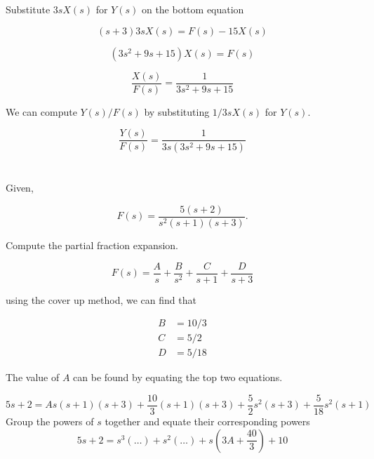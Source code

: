 \documentclass[12pt]{article}
\numberwithin{equation}{section}
\begin{document}
  Substitute $ 3sX(s) $ for $ Y(s) $ on the bottom equation

  \begin{equation}
    (s + 3)3sX(s) = F(s) - 15X(s)
  \end{equation}

  \begin{equation}
    (3s^2 + 9s + 15)X(s) = F(s)
  \end{equation}

  \begin{equation}
    \frac{X(s)}{F(s)} = \frac{1}{3s^2 + 9s + 15}
  \end{equation}

  We can compute $ Y(s)/F(s) $ by substituting $ 1/3sX(s) $ for $ Y(s). $

  \begin{equation}
    \frac{Y(s)}{F(s)} = \frac{1}{3s(3s^2 + 9s + 15)}
  \end{equation}

  \newpage
  \section{}

  Given,

  \[
      F(s) = \frac{5(s+2)}{s ^2(s+1)(s+3)}
    .\]

  Compute the partial fraction expansion.

  \begin{equation}
    F(s) = \frac{A}{s} + \frac{B}{s ^2} + \frac{C}{s+1} + \frac{D}{s + 3}
  \end{equation}

  using the cover up method, we can find that

  \begin{align}
    B &= 10/3 \\
    C &= 5/2 \\
    D &= 5/18
  \end{align}

  The value of $ A $ can be found by equating the top two equations.

  \begin{equation}
    5s + 2 = As(s+1)(s+3) + \frac{10}{3}(s+1)(s+3) + \frac{5}{2}s^2 (s+3) + \frac{5}{18}s^2(s+1)
  \end{equation}
  Group the powers of $ s $ together and equate their corresponding powers
  \begin{equation}
    5s+2 = s^3 (\ldots) + s^2 (\ldots) + s(3A + \frac{40}{3}) + 10
  \end{equation}
\end{document}
